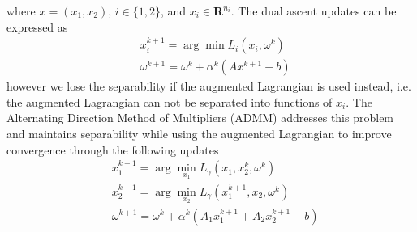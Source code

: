 \documentclass[12pt]{article}
\numberwithin{equation}{section}
\theoremstyle{plain}
\begin{document}
where $x = (x_1, x_2)$, $i \in \{1,2\}$, and  $x_i \in \mathbf{R}^{n_i}$. The dual ascent updates can be expressed as 
\begin{align}
&x_i^{k+1} = \arg\min L_i(x_i, \omega^k)\\
&\omega^{k+1} = \omega^k + \alpha^k(Ax^{k+1} - b)
\end{align}
however we lose the separability if the augmented Lagrangian is used instead, i.e. the augmented Lagrangian can not be separated into functions of $x_i$.  The Alternating Direction Method of Multipliers (ADMM) addresses this problem and maintains separability while using the augmented Lagrangian to improve convergence through the following updates
\begin{align}
&x_1^{k+1} = \arg\min_{x_1} L_{\gamma}(x_1, x_2^k, \omega^k)\\
&x_2^{k+1} = \arg\min_{x_2} L_{\gamma}(x_1^{k+1}, x_2, \omega^k)\\
&\omega^{k+1} = \omega^k + \alpha^k(A_1x_1^{k+1} + A_2x_2^{k+1} - b)
\end{align}
\end{document}
